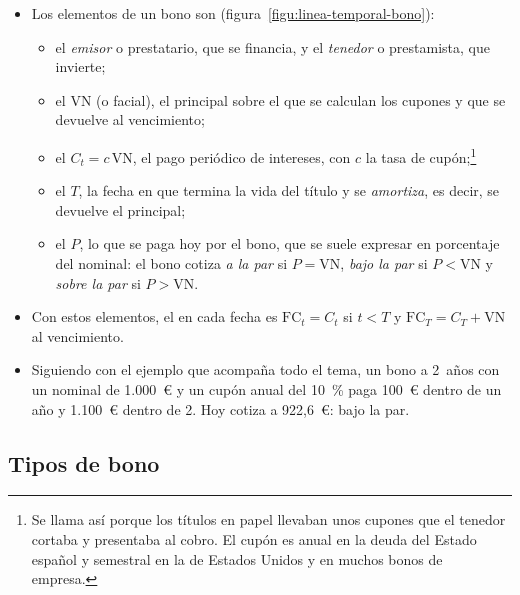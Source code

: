 \documentclass[11pt]{article}
\begin{document}
\begin{itemize}
\item Los elementos de un bono son (figura~\ref{figu:linea-temporal-bono}):
  \begin{itemize}
  \item el \emph{emisor} o prestatario, que se financia, y el \emph{tenedor} o prestamista, que invierte;
  \item el  $\mathrm{VN}$ (o facial), el principal sobre el que se calculan los cupones y que se devuelve al vencimiento;
  \item el  $C_t=c\,\mathrm{VN}$, el pago periódico de intereses, con $c$ la tasa de cupón;\footnote{Se llama así porque los títulos en papel llevaban unos cupones que el tenedor cortaba y presentaba al cobro. El cupón es anual en la deuda del Estado español\nocite{Tesoro2026BonosObligaciones} y semestral en la de Estados Unidos y en muchos bonos de empresa.}
  \item el  $T$, la fecha en que termina la vida del título y se \emph{amortiza}, es decir, se devuelve el principal;
  \item el  $P$, lo que se paga hoy por el bono, que se suele expresar en porcentaje del nominal: el bono cotiza \emph{a la par} si $P=\mathrm{VN}$, \emph{bajo la par} si $P<\mathrm{VN}$ y \emph{sobre la par} si $P>\mathrm{VN}$.
  \end{itemize}
\item Con estos elementos, el  en cada fecha es $\mathrm{FC}_t=C_t$ si $t<T$ y $\mathrm{FC}_T=C_T+\mathrm{VN}$ al vencimiento.
\item Siguiendo con el ejemplo que acompaña todo el tema, un bono a 2~años con un nominal de 1.000~€ y un cupón anual del 10~\% paga 100~€ dentro de un año y 1.100~€ dentro de 2. Hoy cotiza a 922,6~€: bajo la par.
\end{itemize}

\begin{infografia}[H]
\centering
\caption{Los flujos de un bono a lo largo de su vida}\label{figu:linea-temporal-bono}
\end{infografia}

\subsection{Tipos de bono}\label{sec:tipos}
\end{document}
